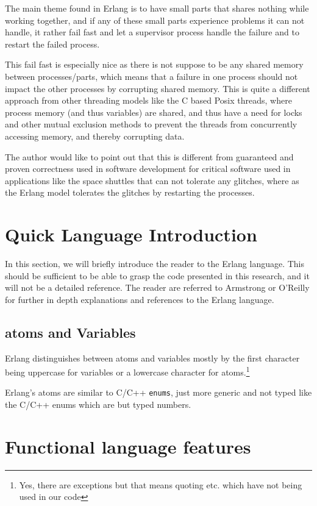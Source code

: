 \documentclass[a4paper,11pt]{report}
\begin{document}
The main theme found in Erlang is to have small parts that shares
nothing while working together, and if any of these small parts
experience problems it can not handle, it rather fail fast and let a
supervisor process handle the failure and to restart the failed
process.

This fail fast is especially nice as there is not suppose to be any
shared memory between processes/parts, which means that a failure in
one process should not impact the other processes by corrupting shared
memory. This is quite a different approach from other threading models
like the C based Posix threads, where process memory (and thus
variables) are shared, and thus have a need for locks and other mutual
exclusion methods to prevent the threads from concurrently accessing
memory, and thereby corrupting data. 

The author would like to point out that this is different from
guaranteed and proven correctness used in software development for
critical software used in applications like the space shuttles that
can not tolerate any glitches, where as the Erlang model tolerates the
glitches by restarting the processes.

\section{Quick Language Introduction}

In this section, we will briefly introduce the reader to the Erlang
language. This should be sufficient to be able to grasp the code
presented in this research, and  it will not be a detailed
reference. The reader are referred to Armstrong\cite{joe:09} or
O'Reilly\cite{O'reilly} for further in depth explanations and
references to the Erlang language.

\subsection{atoms and Variables}

Erlang distinguishes between atoms and variables mostly by the first
character being uppercase for variables or a lowercase character for
atoms.\footnote{Yes, there are exceptions but that means quoting
  etc. which have not being used in our code}

Erlang's atoms are similar to C/C++ \texttt{enums}, just more generic
and not typed like the C/C++ enums which are but typed numbers.


\section{Functional language features}
\end{document}
